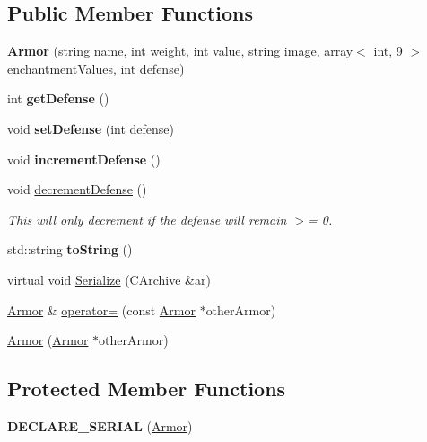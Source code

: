 \subsection*{Public Member Functions}
\begin{DoxyCompactItemize}
\item 
\hypertarget{class_armor_a8f822e9ef6cda3ef8625967682580f11}{}\label{class_armor_a8f822e9ef6cda3ef8625967682580f11} 
{\bfseries Armor} (string name, int weight, int value, string \hyperlink{class_item_add84a42b692ee5d580a92ae4a922f784}{image}, array$<$ int, 9 $>$ \hyperlink{class_item_a8532d8729f9433f41b7fc18b20d83236}{enchantment\+Values}, int defense)
\item 
\hypertarget{class_armor_a9ac9bec755b04172edeb6762db1012d6}{}\label{class_armor_a9ac9bec755b04172edeb6762db1012d6} 
int {\bfseries get\+Defense} ()
\item 
\hypertarget{class_armor_a4d5cc8d20c5fff714925a061ee8ba349}{}\label{class_armor_a4d5cc8d20c5fff714925a061ee8ba349} 
void {\bfseries set\+Defense} (int defense)
\item 
\hypertarget{class_armor_a2acffb5e791465d3c6bef5bfa86e8926}{}\label{class_armor_a2acffb5e791465d3c6bef5bfa86e8926} 
void {\bfseries increment\+Defense} ()
\item 
\hypertarget{class_armor_a18ec027984c729af8580c79b050d57b8}{}\label{class_armor_a18ec027984c729af8580c79b050d57b8} 
void \hyperlink{class_armor_a18ec027984c729af8580c79b050d57b8}{decrement\+Defense} ()
\begin{DoxyCompactList}\small\item\em This will only decrement if the defense will remain $>$= 0. \end{DoxyCompactList}\item 
\hypertarget{class_armor_a37ca0ee6bfab3321d7d5532d61aace2f}{}\label{class_armor_a37ca0ee6bfab3321d7d5532d61aace2f} 
std\+::string {\bfseries to\+String} ()
\item 
virtual void \hyperlink{class_armor_a49d9af5d1a2d02e9dbf05d023f4a6515}{Serialize} (C\+Archive \&ar)
\item 
\hyperlink{class_armor}{Armor} \& \hyperlink{class_armor_a167690954e4ccd6c4fd9adfed24bc132}{operator=} (const \hyperlink{class_armor}{Armor} $\ast$other\+Armor)
\item 
\hyperlink{class_armor_abee983c0e4e8fd5a5d3fccebc6d079dc}{Armor} (\hyperlink{class_armor}{Armor} $\ast$other\+Armor)
\end{DoxyCompactItemize}
\subsection*{Protected Member Functions}
\begin{DoxyCompactItemize}
\item 
\hypertarget{class_armor_a3a34973e61986f0d0623f5e80f8277df}{}\label{class_armor_a3a34973e61986f0d0623f5e80f8277df} 
{\bfseries D\+E\+C\+L\+A\+R\+E\+\_\+\+S\+E\+R\+I\+AL} (\hyperlink{class_armor}{Armor})
\end{DoxyCompactItemize}
